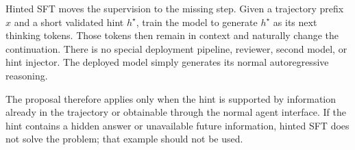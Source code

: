Hinted SFT moves the supervision to the missing step. Given a trajectory prefix $x$ and a
short validated hint $h^\star$, train the model to generate $h^\star$ as its next thinking
tokens. Those tokens then remain in context and naturally change the continuation. There
is no special deployment pipeline, reviewer, second model, or hint injector. The deployed
model simply generates its normal autoregressive reasoning.

The proposal therefore applies only when the hint is supported by information already in
the trajectory or obtainable through the normal agent interface. If the hint contains a
hidden answer or unavailable future information, hinted SFT does not solve the problem;
that example should not be used.
